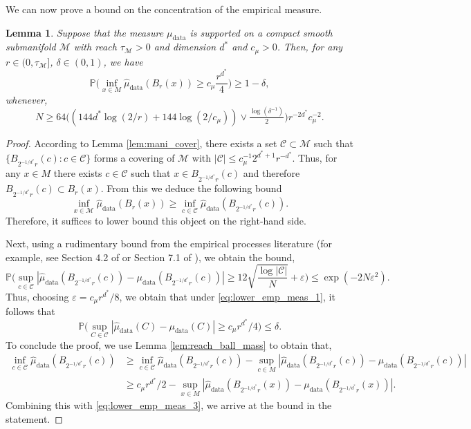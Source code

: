 \documentclass[10pt]{article}
\theoremstyle{plain}
\newtheorem{lemma}[theorem]{Lemma}
\theoremstyle{definition}
\theoremstyle{remark}
\newcommand{\M}{{\mathcal{M}}}
\newcommand{\prob}{\mathbb{P}}
\newcommand{\mud}{\mu_{\operatorname{data}}}
\newcommand{\hmud}{\hat{\mu}_{\operatorname{data}}}
\begin{document}
We can now prove a bound on the concentration of the empirical measure.
\begin{lemma}\label{lem:lower_emp_meas}
Suppose that the measure \(\mud\) is supported on a compact smooth submanifold \(\M\) with reach \(\tau_\M > 0\) and dimension \(d^*\) and \(c_\mu > 0\). Then, for any \(r \in (0, \tau_\M]\), \(\delta \in (0, 1)\), we have
\begin{equation*}
    \prob \bigg ( \inf_{x \in M} \hmud(B_r(x)) \geq c_\mu \frac{r^{d^*}}{4} \bigg ) \geq 1 - \delta,
\end{equation*}
whenever,
\begin{equation}\label{eq:lower_emp_meas_1}
    N \geq 64 \Big ( (144 d^* \log(2/r) + 144 \log(2/c_\mu)) \vee \tfrac{\log(\delta^{-1})}{2} \Big ) r^{-2d^*} c_\mu^{-2}.
\end{equation}
\end{lemma}
\begin{proof}
According to Lemma \ref{lem:mani_cover}, there exists a set \(\mathcal{C} \subset \M\) such that \(\{B_{2^{-1/d^*}r}(c): c \in \mathcal{C}\}\) forms a covering of \(\M\) with \(|\mathcal{C}| \leq c_\mu^{-1} 2^{d^* + 1} r^{-d^*}\). Thus, for any \(x \in M\) there exists \(c \in \mathcal{C}\) such that \(x \in B_{2^{-1/d^*} r}(c)\) and therefore \(B_{2^{-1/d^*} r}(c) \subset B_r(x)\). From this we deduce the following bound
\begin{equation*}
    \inf_{x \in \M} \hmud(B_r(x)) \geq \inf_{c \in \mathcal{C}} \hmud(B_{2^{-1/d^*} r}(c)).
\end{equation*}
Therefore, it suffices to lower bound this object on the right-hand side.

Next, using a rudimentary bound from the empirical processes literature (for example, see Section 4.2 of \citep{Wainwright2019-rz} or Section 7.1 of \citep{van-Handel2014-cs}), we obtain the bound,
\begin{equation*}
    \prob \bigg ( \sup_{c \in \mathcal{C}}| \hmud(B_{2^{-1/d^*}r}(c)) - \mud(B_{2^{-1/d^*}r}(c))| \geq 12 \sqrt{\frac{\log{|\mathcal{C}|}}{N}} + \varepsilon \bigg ) \leq \exp(-2N\varepsilon^2).
\end{equation*}
Thus, choosing \(\varepsilon = c_\mu r^{d^*}/8\), we obtain that under \eqref{eq:lower_emp_meas_1}, it follows that
\begin{equation}\label{eq:lower_emp_meas_3}
    \prob \bigg ( \sup_{C \in \mathcal{C}}| \hmud(C) - \mud(C)| \geq c_\mu r^{d^*}/4 \bigg ) \leq \delta.
\end{equation}
To conclude the proof, we use Lemma \ref{lem:reach_ball_mass} to obtain that,
\begin{align*}
    \inf_{c \in \mathcal{C}} \hmud(B_{2^{-1/d^*}r}(c)) &\geq \inf_{c \in \mathcal{C}} \hmud(B_{2^{-1/d^*}r}(c)) - \sup_{c \in M} | \hmud(B_{2^{-1/d^*}r}(c)) - \mud(B_{2^{-1/d^*}r}(c))|\\
    &\geq c_\mu r^{d^*}/2 - \sup_{x \in M} | \hmud(B_{2^{-1/d^*}r}(x)) - \mud(B_{2^{-1/d^*}r}(x))|.
\end{align*}
Combining this with \eqref{eq:lower_emp_meas_3}, we arrive at the bound in the statement.
\end{proof}
\end{document}
